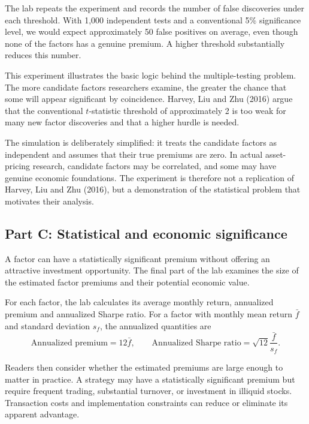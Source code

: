 The lab repeats the experiment and records the number of false discoveries under each threshold. With 1,000 independent tests and a conventional 5\% significance level, we would expect approximately 50 false positives on average, even though none of the factors has a genuine premium. A higher threshold substantially reduces this number.

This experiment illustrates the basic logic behind the multiple-testing problem. The more candidate factors researchers examine, the greater the chance that some will appear significant by coincidence. Harvey, Liu and Zhu (2016) argue that the conventional $t$-statistic threshold of approximately 2 is too weak for many new factor discoveries and that a higher hurdle is needed.

The simulation is deliberately simplified: it treats the candidate factors as independent and assumes that their true premiums are zero. In actual asset-pricing research, candidate factors may be correlated, and some may have genuine economic foundations. The experiment is therefore not a replication of Harvey, Liu and Zhu (2016), but a demonstration of the statistical problem that motivates their analysis.

\subsection*{Part C: Statistical and economic significance}

A factor can have a statistically significant premium without offering an attractive investment opportunity. The final part of the lab examines the size of the estimated factor premiums and their potential economic value.

For each factor, the lab calculates its average monthly return, annualized premium and annualized Sharpe ratio. For a factor with monthly mean return $\bar{f}$ and standard deviation $s_f$, the annualized quantities are
\begin{equation}
  \text{Annualized premium}=12\bar{f},
  \qquad
  \text{Annualized Sharpe ratio}
  =\sqrt{12}\frac{\bar{f}}{s_f}.
  \label{eq:03-lab-sharpe}
\end{equation}

Readers then consider whether the estimated premiums are large enough to matter in practice. A strategy may have a statistically significant premium but require frequent trading, substantial turnover, or investment in illiquid stocks. Transaction costs and implementation constraints can reduce or eliminate its apparent advantage.

